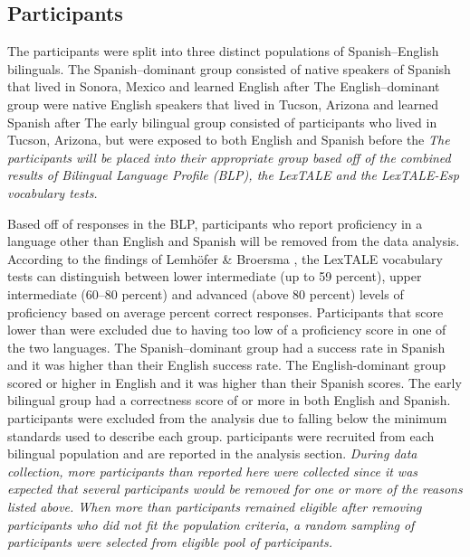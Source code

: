 \documentclass[
12pt, %
english, %
doublespacing, %
nolistspacing, %
liststotoc, %
headsepline, %
chapterinoneline, %
openany, %
]{DoctoralThesis}\usepackage[]{graphicx}\usepackage[]{color}
\begin{document}
\subsection{Participants}

The participants were split into three distinct populations of Spanish–English bilinguals. The Spanish–dominant group consisted of native speakers of Spanish that lived in Sonora, Mexico and learned English after %
The English–dominant group were native English speakers that lived in Tucson, Arizona and learned Spanish after%
The early bilingual group consisted of participants who lived in Tucson, Arizona, but were exposed to both English and Spanish before the %
\emph{The participants will be placed into their appropriate group based off of the combined results of Bilingual Language Profile (BLP), the LexTALE and the LexTALE-Esp vocabulary tests.} 

Based off of responses in the BLP, participants who report proficiency in a language other than English and Spanish will be removed from the data analysis. According to the findings of Lemhöfer \& Broersma \parencite*{Lemhofer2012-hz}, the LexTALE vocabulary tests can distinguish between lower intermediate (up to 59 percent), upper intermediate (60–80 percent) and advanced (above 80 percent) levels of proficiency based on average percent correct responses. Participants that score lower than %
were excluded due to having too low of a proficiency score in one of the two languages. The Spanish–dominant group had a %
success rate in Spanish and it was higher than their English success rate. The English-dominant group scored %
or higher in English and it was higher than their Spanish scores. The early bilingual group had a correctness score of %
or more in both English and Spanish. %
participants were excluded from the analysis due to falling below the minimum standards used to describe each group. %
participants were recruited from each bilingual population and are reported in the analysis section. 
\emph{During data collection, more participants than reported here were collected since it was expected that several participants would be removed for one or more of the reasons listed above. When more than %
participants remained eligible after removing participants who did not fit the population criteria, a random sampling of %
participants were selected from eligible pool of participants.}
\end{document}
